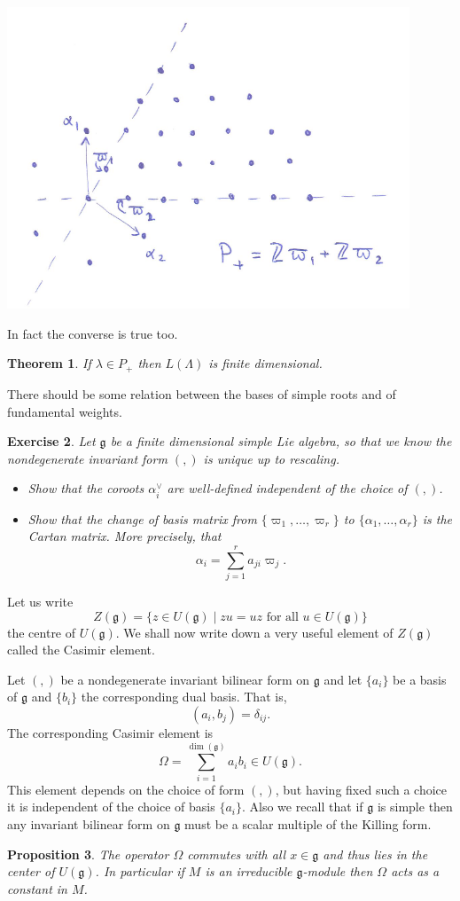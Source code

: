 \documentclass[12pt]{article}
\theoremstyle{plain}
\newtheorem{thm}{Theorem}[section]
\newtheorem{prop}[thm]{Proposition}
\newtheorem{exer}[thm]{Exercise}
\theoremstyle{definition}
\numberwithin{equation}{section}
\newcommand{\al}{\alpha}
\newcommand{\La}{\Lambda}
\newcommand{\g}{\mathfrak{g}}
\begin{document}
\begin{center}
\includegraphics[width=120mm]{P+sl3.png}
\end{center}

In fact the converse is true too.
\begin{thm}\label{thm:P+.implies.fin.dim}
If $\lambda \in P_+$ then $L(\La)$ is finite dimensional.
\end{thm}

There should be some relation between the bases of simple roots and of fundamental weights.
\begin{exer}
Let $\g$ be a finite dimensional simple Lie algebra, so that we know the nondegenerate invariant form $(,)$ is unique up to rescaling.
\begin{itemize}
\item Show that the coroots $\al_i^\vee$ are well-defined independent of the choice of $(,)$.

\item Show that the change of basis matrix from $\{\varpi_1, \ldots, \varpi_r\}$ to $\{\al_1, \ldots, \al_r\}$ is the Cartan matrix. More precisely, that
\[
\al_i = \sum_{j=1}^r a_{ji} \varpi_j.
\]
\end{itemize}
\end{exer}

Let us write
\[
Z(\g) = \{z \in U(\g) \mid \text{$zu = uz$ for all $u \in U(\g)$}\}
\]
the centre of $U(\g)$. We shall now write down a very useful element of $Z(\g)$ called the Casimir element.


Let $(,)$ be a nondegenerate invariant bilinear form on $\g$ and let $\{a_i\}$ be a basis of $\g$ and $\{b_i\}$ the corresponding dual basis. That is,
\[
(a_i, b_j) = \delta_{ij}.
\]
The corresponding Casimir element is
\[
\Omega = \sum_{i=1}^{\dim(\g)} a_i b_i \in U(\g).
\]
This element depends on the choice of form $(,)$, but having fixed such a choice it is independent of the choice of basis $\{a_i\}$. Also we recall that if $\g$ is simple then any invariant bilinear form on $\g$ must be a scalar multiple of the Killing form.
\begin{prop}
The operator $\Omega$ commutes with all $x \in \g$ and thus lies in the center of $U(\g)$. In particular if $M$ is an irreducible $\g$-module then $\Omega$ acts as a constant in $M$.
\end{prop}
\end{document}
